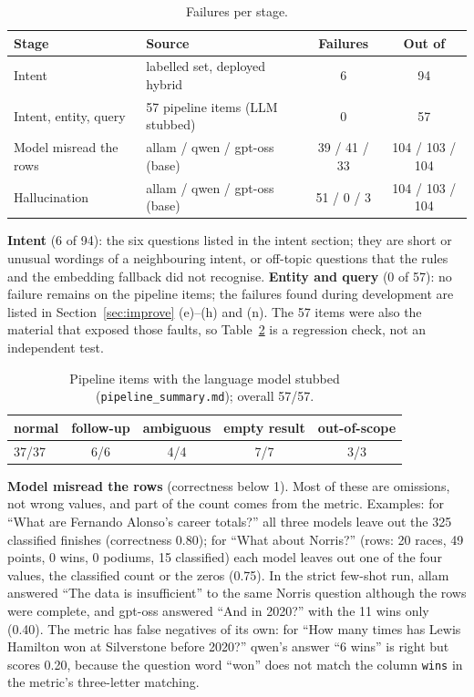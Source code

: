\documentclass[10pt,a4paper]{article}
\newcommand{\code}[1]{\texttt{#1}}
\begin{document}
\begin{table}[H]
\centering\small
\caption{Failures per stage.}\label{tab:stages}
\begin{tabular}{llcc}
\toprule
Stage & Source & Failures & Out of \\
\midrule
Intent & labelled set, deployed hybrid & 6 & 94 \\
Intent, entity, query & 57 pipeline items (LLM stubbed) & 0 & 57 \\
Model misread the rows & allam / qwen / gpt-oss (base) & 39 / 41 / 33 & 104 / 103 / 104 \\
Hallucination & allam / qwen / gpt-oss (base) & 51 / 0 / 3 & 104 / 103 / 104 \\
\bottomrule
\end{tabular}
\end{table}

\textbf{Intent} (6 of 94): the six questions listed in the intent section; they are short or unusual wordings of a neighbouring intent, or off-topic questions that the rules and the embedding fallback did not recognise. \textbf{Entity and query} (0 of 57): no failure remains on the pipeline items; the failures found during development are listed in Section~\ref{sec:improve} (e)--(h) and (n). The 57 items were also the material that exposed those faults, so Table~\ref{tab:pipeline} is a regression check, not an independent test.

\begin{table}[H]
\centering\small
\caption{Pipeline items with the language model stubbed (\code{pipeline\_summary.md}); overall 57/57.}\label{tab:pipeline}
\begin{tabular}{lcccc}
\toprule
normal & follow-up & ambiguous & empty result & out-of-scope \\
\midrule
37/37 & 6/6 & 4/4 & 7/7 & 3/3 \\
\bottomrule
\end{tabular}
\end{table}

\textbf{Model misread the rows} (correctness below 1). Most of these are omissions, not wrong values, and part of the count comes from the metric. Examples: for ``What are Fernando Alonso's career totals?'' all three models leave out the 325 classified finishes (correctness 0.80); for ``What about Norris?'' (rows: 20 races, 49 points, 0 wins, 0 podiums, 15 classified) each model leaves out one of the four values, the classified count or the zeros (0.75). In the strict few-shot run, allam answered ``The data is insufficient'' to the same Norris question although the rows were complete, and gpt-oss answered ``And in 2020?'' with the 11 wins only (0.40). The metric has false negatives of its own: for ``How many times has Lewis Hamilton won at Silverstone before 2020?'' qwen's answer ``6 wins'' is right but scores 0.20, because the question word ``won'' does not match the column \code{wins} in the metric's three-letter matching.
\end{document}
